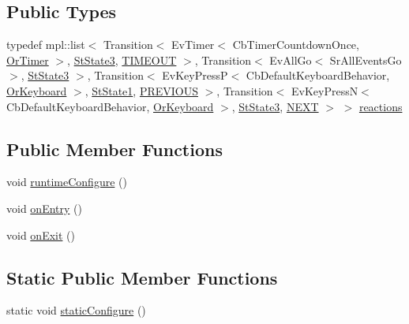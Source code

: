 \subsection*{Public Types}
\begin{DoxyCompactItemize}
\item 
typedef mpl\+::list$<$ Transition$<$ Ev\+Timer$<$ Cb\+Timer\+Countdown\+Once, \hyperlink{classsm__three__some_1_1OrTimer}{Or\+Timer} $>$, \hyperlink{structsm__three__some_1_1StState3}{St\+State3}, \hyperlink{structsm__three__some_1_1StState2_1_1TIMEOUT}{T\+I\+M\+E\+O\+UT} $>$, Transition$<$ Ev\+All\+Go$<$ Sr\+All\+Events\+Go $>$, \hyperlink{structsm__three__some_1_1StState3}{St\+State3} $>$, Transition$<$ Ev\+Key\+PressP$<$ Cb\+Default\+Keyboard\+Behavior, \hyperlink{classsm__three__some_1_1OrKeyboard}{Or\+Keyboard} $>$, \hyperlink{structsm__three__some_1_1StState1}{St\+State1}, \hyperlink{structsm__three__some_1_1StState2_1_1PREVIOUS}{P\+R\+E\+V\+I\+O\+US} $>$, Transition$<$ Ev\+Key\+PressN$<$ Cb\+Default\+Keyboard\+Behavior, \hyperlink{classsm__three__some_1_1OrKeyboard}{Or\+Keyboard} $>$, \hyperlink{structsm__three__some_1_1StState3}{St\+State3}, \hyperlink{structsm__three__some_1_1StState2_1_1NEXT}{N\+E\+XT} $>$ $>$ \hyperlink{structsm__three__some_1_1StState2_a882f17a676c2edc41d5e3a76c5255c87}{reactions}
\end{DoxyCompactItemize}
\subsection*{Public Member Functions}
\begin{DoxyCompactItemize}
\item 
void \hyperlink{structsm__three__some_1_1StState2_aab0c27caa0d5a70c644ee1ec0830ba15}{runtime\+Configure} ()
\item 
void \hyperlink{structsm__three__some_1_1StState2_ac117bcbd7f1afe6ea699109923795b50}{on\+Entry} ()
\item 
void \hyperlink{structsm__three__some_1_1StState2_af1c453aa52e2117b3a059ae11625963b}{on\+Exit} ()
\end{DoxyCompactItemize}
\subsection*{Static Public Member Functions}
\begin{DoxyCompactItemize}
\item 
static void \hyperlink{structsm__three__some_1_1StState2_af07ae40962e343ce9605288f0ebad82b}{static\+Configure} ()
\end{DoxyCompactItemize}
